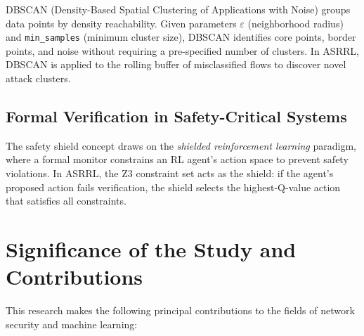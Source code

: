\documentclass[12pt, letterpaper, oneside]{report}
\newcommand{\ASRRL}{\textsc{ASRRL}}
\begin{document}
DBSCAN (Density-Based Spatial Clustering of Applications with Noise) groups data points by density reachability. Given parameters $\varepsilon$ (neighborhood radius) and \texttt{min\_samples} (minimum cluster size), DBSCAN identifies core points, border points, and noise without requiring a pre-specified number of clusters. In \ASRRL{}, DBSCAN is applied to the rolling buffer of misclassified flows to discover novel attack clusters.

\subsection{Formal Verification in Safety-Critical Systems}

The safety shield concept draws on the \emph{shielded reinforcement learning} paradigm, where a formal monitor constrains an RL agent's action space to prevent safety violations. In \ASRRL{}, the Z3 constraint set acts as the shield: if the agent's proposed action fails verification, the shield selects the highest-Q-value action that satisfies all constraints.


\section{Significance of the Study and Contributions}
\label{sec:significance}

This research makes the following principal contributions to the fields of network security and machine learning:
\end{document}
